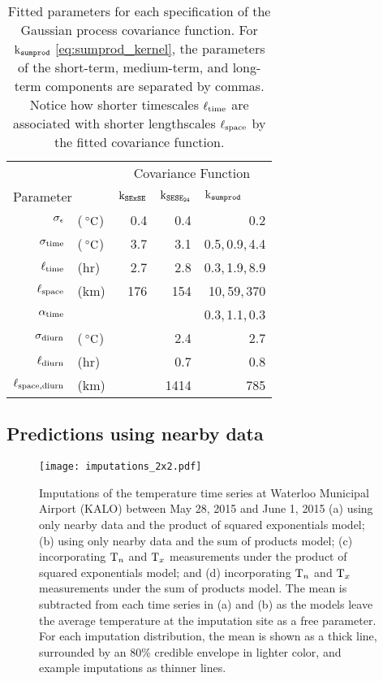 \begin{table}[tbp]
\begin{center}
\bgroup
\def\arraystretch{1.1}%
\addtolength{\tabcolsep}{6pt}  
\begin{tabular}{r@{ }lrrr}
\hline
&& \multicolumn{3}{c}{Covariance Function} \\
\multicolumn{2}{l}{Parameter} & \multicolumn{1}{l}{\(\operatorname{k_{\mathtt{SExSE}}}\)} & \multicolumn{1}{l}{\(\operatorname{k_{\mathtt{SESE_{24}}}}\)} & \multicolumn{1}{l}{\(\operatorname{k_{\mathtt{sumprod}}}\)} \\
\hline
$\sigma_{\epsilon}$ &	(${\,^\circ}{}\mathrm{C}$) &	0.4 &	0.4 &	0.2\\ 
\hline
$\sigma_{\mathrm{time}}$ &	(${\,^\circ}{}\mathrm{C}$) &	3.7 &	3.1 &	0.5,\,0.9,\,4.4\\ 
$\ell_{\mathrm{time}}$ &	($\mathrm{hr}$) &	2.7 &	2.8 &	0.3,\,1.9,\,8.9\\ 
$\ell_{\mathrm{space}}$ &	($\mathrm{km}$) &	176 &	154 &	10,\,59,\,370\\ 
$\alpha_{\mathrm{time}}$ &	 &		 &		 &	0.3,\,1.1,\,0.3\\ 
\hline
$\sigma_{\mathrm{diurn}}$ &	(${\,^\circ}{}\mathrm{C}$) &		 &	2.4 &	2.7\\ 
$\ell_{\mathrm{diurn}}$ &	($\mathrm{hr}$) &		 &	0.7 &	0.8\\ 
$\ell_{\mathrm{space}{},\mathrm{diurn}}$ &	($\mathrm{km}$) &		 &	1414 &	785\\ 
\hline
\end{tabular}
\addtolength{\tabcolsep}{-3pt}  
\caption{
    Fitted parameters for each specification of the Gaussian process covariance function.
    For \(\operatorname{k_{\mathtt{sumprod}}}\) \autoref{eq:sumprod_kernel}, the parameters of the short-term, medium-term, and long-term components are separated by commas.
    Notice how shorter timescales \(\ell_{\mathrm{time}}\) are associated with shorter lengthscales \(\ell_{\mathrm{space}}\) by the fitted covariance function.
    \label{table:fitted_params}
}
\egroup
\end{center}
\end{table}
    
\subsection{Predictions using nearby data}
\label{sec:predict_nearby}
    

\begin{figure}[tb]
\centering
\texttt{[image: imputations\_2x2.pdf]}
\caption{\label{fig:imputations_2x2}Imputations of the temperature time series at Waterloo Municipal Airport (KALO) between May 28, 2015 and June 1, 2015 (a) using only nearby data and the product of squared exponentials model; (b) using only nearby data and the sum of products model; (c) incorporating \(\mathrm{T}_{n}\) and \(\mathrm{T}_{x}\) measurements under the product of squared exponentials model; and (d) incorporating \(\mathrm{T}_{n}\) and \(\mathrm{T}_{x}\) measurements under the sum of products model. The mean is subtracted from each time series in (a) and (b) as the models leave the average temperature at the imputation site as a free parameter. For each imputation distribution, the mean is shown as a thick line, surrounded by an 80\% credible envelope in lighter color, and example imputations as thinner lines.}
\end{figure}

